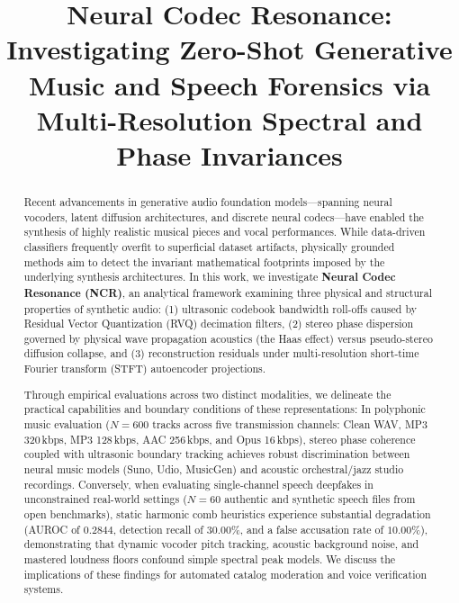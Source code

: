 \documentclass[conference]{IEEEtran}
\theoremstyle{definition}
\begin{document}
\title{Neural Codec Resonance: Investigating Zero-Shot Generative Music and Speech Forensics via Multi-Resolution Spectral and Phase Invariances}

\author{
}

\maketitle

\begin{abstract}
Recent advancements in generative audio foundation models—spanning neural vocoders, latent diffusion architectures, and discrete neural codecs—have enabled the synthesis of highly realistic musical pieces and vocal performances. While data-driven classifiers frequently overfit to superficial dataset artifacts, physically grounded methods aim to detect the invariant mathematical footprints imposed by the underlying synthesis architectures. In this work, we investigate \textbf{Neural Codec Resonance (NCR)}, an analytical framework examining three physical and structural properties of synthetic audio: (1) ultrasonic codebook bandwidth roll-offs caused by Residual Vector Quantization (RVQ) decimation filters, (2) stereo phase dispersion governed by physical wave propagation acoustics (the Haas effect) versus pseudo-stereo diffusion collapse, and (3) reconstruction residuals under multi-resolution short-time Fourier transform (STFT) autoencoder projections. 

Through empirical evaluations across two distinct modalities, we delineate the practical capabilities and boundary conditions of these representations:
In polyphonic music evaluation ($N=600$ tracks across five transmission channels: Clean WAV, MP3 320\,kbps, MP3 128\,kbps, AAC 256\,kbps, and Opus 16\,kbps), stereo phase coherence coupled with ultrasonic boundary tracking achieves robust discrimination between neural music models (Suno, Udio, MusicGen) and acoustic orchestral/jazz studio recordings. 
Conversely, when evaluating single-channel speech deepfakes in unconstrained real-world settings ($N=60$ authentic and synthetic speech files from open benchmarks), static harmonic comb heuristics experience substantial degradation (AUROC of $0.2844$, detection recall of $30.00\%$, and a false accusation rate of $10.00\%$), demonstrating that dynamic vocoder pitch tracking, acoustic background noise, and mastered loudness floors confound simple spectral peak models. We discuss the implications of these findings for automated catalog moderation and voice verification systems.
\end{abstract}
\end{document}
